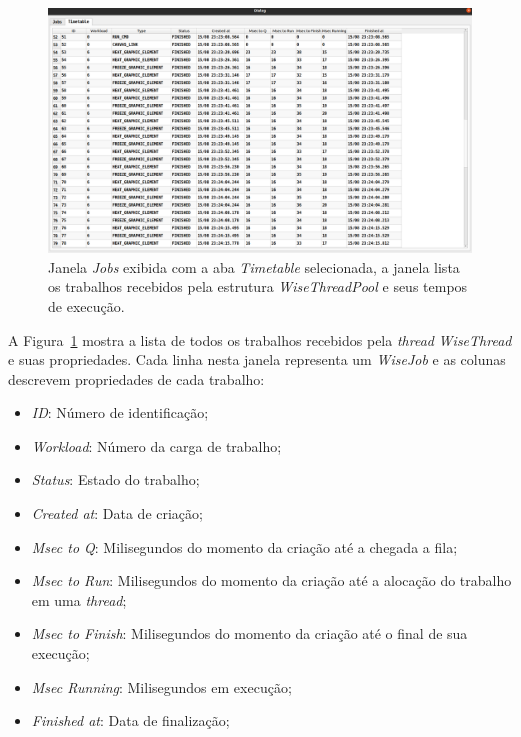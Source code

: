 \begin{figure}[!htbp]
	\centering
	\includegraphics[width=\linewidth]{Figures/IGU_023.png}
	\caption{Janela \textit{Jobs} exibida com a aba \textit{Timetable} selecionada, a janela lista os trabalhos recebidos pela estrutura \textit{WiseThreadPool} e seus tempos de execução.}
	\label{fig:jobs}
\end{figure}

A Figura~\ref{fig:jobs} mostra a lista de todos os trabalhos recebidos pela \textit{thread} \textit{WiseThread} e suas propriedades. Cada linha nesta janela representa um \textit{WiseJob} e as colunas descrevem propriedades de cada trabalho:

\begin{itemize}
	\item \textit{ID}: Número de identificação;
	\item \textit{Workload}: Número da carga de trabalho;
	\item \textit{Status}: Estado do trabalho;
	\item \textit{Created at}: Data de criação;
	\item \textit{Msec to Q}: Milisegundos do momento da criação até a chegada a fila;
	\item \textit{Msec to Run}: Milisegundos do momento da criação até a alocação do trabalho em uma \textit{thread};
	\item \textit{Msec to Finish}: Milisegundos do momento da criação até o final de sua execução;
	\item \textit{Msec Running}: Milisegundos em execução;
	\item \textit{Finished at}: Data de finalização;
\end{itemize}

